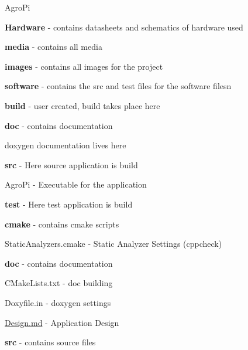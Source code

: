 
\begin{DoxyItemize}
\item Agro\+Pi
\begin{DoxyItemize}
\item {\bfseries Hardware} -\/ contains datasheets and schematics of hardware used
\item {\bfseries media} -\/ contains all media
\begin{DoxyItemize}
\item {\bfseries images} -\/ contains all images for the project
\end{DoxyItemize}
\item {\bfseries software} -\/ contains the src and test files for the software filesn
\begin{DoxyItemize}
\item {\bfseries build} -\/ user created, build takes place here
\begin{DoxyItemize}
\item {\bfseries doc} -\/ contains documentation
\begin{DoxyItemize}
\item doxygen documentation lives here
\end{DoxyItemize}
\item {\bfseries src} -\/ Here source application is build
\begin{DoxyItemize}
\item Agro\+Pi -\/ Executable for the application
\end{DoxyItemize}
\item {\bfseries test} -\/ Here test application is build
\end{DoxyItemize}
\item {\bfseries cmake} -\/ contains cmake scripts
\begin{DoxyItemize}
\item Static\+Analyzers.\+cmake -\/ Static Analyzer Settings (cppcheck)
\end{DoxyItemize}
\item {\bfseries doc} -\/ contains documentation
\begin{DoxyItemize}
\item C\+Make\+Lists.\+txt -\/ doc building
\item Doxyfile.\+in -\/ doxygen settings
\item \hyperlink{Design_8md}{Design.\+md} -\/ Application Design
\end{DoxyItemize}
\item {\bfseries src} -\/ contains source files
\begin{DoxyItemize}

\end{DoxyItemize}
\end{DoxyItemize}
\end{DoxyItemize}
\end{DoxyItemize}
